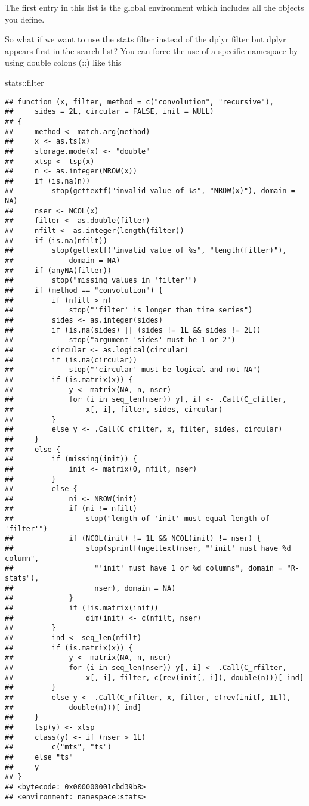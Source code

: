 \documentclass[
]{article}
\newenvironment{Shaded}{\begin{snugshade}}{\end{snugshade}}
\newcommand{\NormalTok}[1]{#1}
\newcommand{\SpecialCharTok}[1]{\textcolor[rgb]{0.00,0.00,0.00}{#1}}
\begin{document}
The first entry in this list is the global environment which includes
all the objects you define.

So what if we want to use the stats filter instead of the dplyr filter
but dplyr appears first in the search list? You can force the use of a
specific namespace by using double colons (::) like this

\begin{Shaded}
\begin{Highlighting}[]
\NormalTok{stats}\SpecialCharTok{::}\NormalTok{filter}
\end{Highlighting}
\end{Shaded}

\begin{verbatim}
## function (x, filter, method = c("convolution", "recursive"), 
##     sides = 2L, circular = FALSE, init = NULL) 
## {
##     method <- match.arg(method)
##     x <- as.ts(x)
##     storage.mode(x) <- "double"
##     xtsp <- tsp(x)
##     n <- as.integer(NROW(x))
##     if (is.na(n)) 
##         stop(gettextf("invalid value of %s", "NROW(x)"), domain = NA)
##     nser <- NCOL(x)
##     filter <- as.double(filter)
##     nfilt <- as.integer(length(filter))
##     if (is.na(nfilt)) 
##         stop(gettextf("invalid value of %s", "length(filter)"), 
##             domain = NA)
##     if (anyNA(filter)) 
##         stop("missing values in 'filter'")
##     if (method == "convolution") {
##         if (nfilt > n) 
##             stop("'filter' is longer than time series")
##         sides <- as.integer(sides)
##         if (is.na(sides) || (sides != 1L && sides != 2L)) 
##             stop("argument 'sides' must be 1 or 2")
##         circular <- as.logical(circular)
##         if (is.na(circular)) 
##             stop("'circular' must be logical and not NA")
##         if (is.matrix(x)) {
##             y <- matrix(NA, n, nser)
##             for (i in seq_len(nser)) y[, i] <- .Call(C_cfilter, 
##                 x[, i], filter, sides, circular)
##         }
##         else y <- .Call(C_cfilter, x, filter, sides, circular)
##     }
##     else {
##         if (missing(init)) {
##             init <- matrix(0, nfilt, nser)
##         }
##         else {
##             ni <- NROW(init)
##             if (ni != nfilt) 
##                 stop("length of 'init' must equal length of 'filter'")
##             if (NCOL(init) != 1L && NCOL(init) != nser) {
##                 stop(sprintf(ngettext(nser, "'init' must have %d column", 
##                   "'init' must have 1 or %d columns", domain = "R-stats"), 
##                   nser), domain = NA)
##             }
##             if (!is.matrix(init)) 
##                 dim(init) <- c(nfilt, nser)
##         }
##         ind <- seq_len(nfilt)
##         if (is.matrix(x)) {
##             y <- matrix(NA, n, nser)
##             for (i in seq_len(nser)) y[, i] <- .Call(C_rfilter, 
##                 x[, i], filter, c(rev(init[, i]), double(n)))[-ind]
##         }
##         else y <- .Call(C_rfilter, x, filter, c(rev(init[, 1L]), 
##             double(n)))[-ind]
##     }
##     tsp(y) <- xtsp
##     class(y) <- if (nser > 1L) 
##         c("mts", "ts")
##     else "ts"
##     y
## }
## <bytecode: 0x000000001cbd39b8>
## <environment: namespace:stats>
\end{verbatim}
\end{document}
